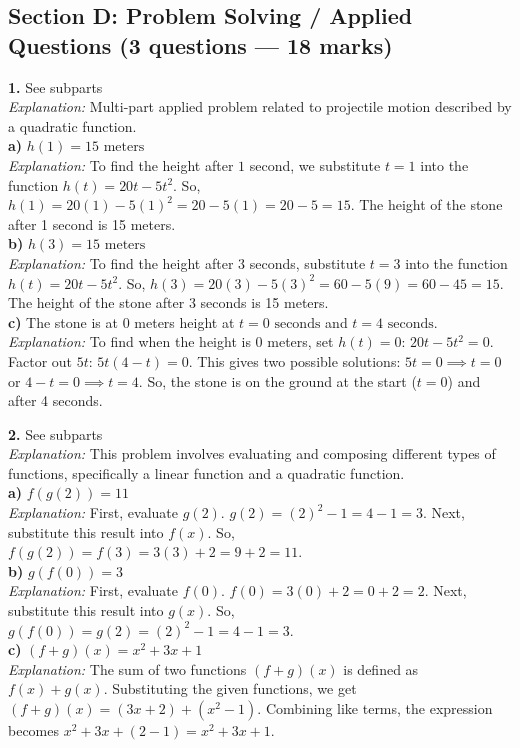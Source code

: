 \documentclass[12pt,a4paper]{article}
\begin{document}
\subsection*{Section D: Problem Solving / Applied Questions \normalfont\small (3 questions --- 18 marks)}
\vspace{4pt}
\begin{answerbox}
\noindent\textbf{1.} See subparts
\\ \noindent\textit{Explanation:} Multi-part applied problem related to projectile motion described by a quadratic function.
\\\textbf{a)} $h(1) = 15 \text{ meters}$\\\textit{Explanation:} To find the height after $1$ second, we substitute $t=1$ into the function $h(t) = 20t - 5t^2$. So, $h(1) = 20(1) - 5(1)^2 = 20 - 5(1) = 20 - 5 = 15$. The height of the stone after 1 second is 15 meters.
\\\textbf{b)} $h(3) = 15 \text{ meters}$\\\textit{Explanation:} To find the height after $3$ seconds, substitute $t=3$ into the function $h(t) = 20t - 5t^2$. So, $h(3) = 20(3) - 5(3)^2 = 60 - 5(9) = 60 - 45 = 15$. The height of the stone after 3 seconds is 15 meters.
\\\textbf{c)} The stone is at $0$ meters height at $t=0 \text{ seconds}$ and $t=4 \text{ seconds}$.\\\textit{Explanation:} To find when the height is $0$ meters, set $h(t)=0$: $20t - 5t^2 = 0$. Factor out $5t$: $5t(4-t) = 0$. This gives two possible solutions: $5t=0 \implies t=0$ or $4-t=0 \implies t=4$. So, the stone is on the ground at the start ($t=0$) and after 4 seconds.
\end{answerbox}
\vspace{4pt}
\begin{answerbox}
\noindent\textbf{2.} See subparts
\\ \noindent\textit{Explanation:} This problem involves evaluating and composing different types of functions, specifically a linear function and a quadratic function.
\\\textbf{a)} $f(g(2)) = 11$\\\textit{Explanation:} First, evaluate $g(2)$. $g(2) = (2)^2 - 1 = 4 - 1 = 3$. Next, substitute this result into $f(x)$. So, $f(g(2)) = f(3) = 3(3) + 2 = 9 + 2 = 11$.
\\\textbf{b)} $g(f(0)) = 3$\\\textit{Explanation:} First, evaluate $f(0)$. $f(0) = 3(0) + 2 = 0 + 2 = 2$. Next, substitute this result into $g(x)$. So, $g(f(0)) = g(2) = (2)^2 - 1 = 4 - 1 = 3$.
\\\textbf{c)} $(f+g)(x) = x^2 + 3x + 1$\\\textit{Explanation:} The sum of two functions $(f+g)(x)$ is defined as $f(x) + g(x)$. Substituting the given functions, we get $(f+g)(x) = (3x+2) + (x^2-1)$. Combining like terms, the expression becomes $x^2 + 3x + (2-1) = x^2 + 3x + 1$.
\end{answerbox}
\end{document}
